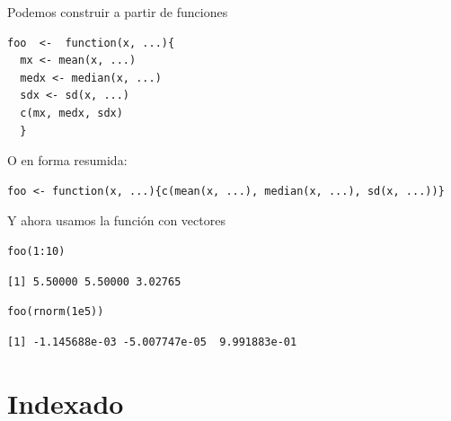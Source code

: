 \documentclass[xcolor={usenames,svgnames,dvipsnames}]{beamer}
\begin{document}
\begin{frame}[fragile,label={sec:orgheadline35}]{Podemos construir a partir de funciones}
 \lstset{language=R,label= ,caption= ,captionpos=b,numbers=none}
\begin{lstlisting}
foo  <-  function(x, ...){
  mx <- mean(x, ...)
  medx <- median(x, ...)
  sdx <- sd(x, ...)
  c(mx, medx, sdx)
  }
\end{lstlisting}

O en forma resumida:
\lstset{language=R,label= ,caption= ,captionpos=b,numbers=none}
\begin{lstlisting}
foo <- function(x, ...){c(mean(x, ...), median(x, ...), sd(x, ...))}
\end{lstlisting}
\end{frame}


\begin{frame}[fragile,label={sec:orgheadline36}]{Y ahora usamos la función con vectores}
 \lstset{language=R,label= ,caption= ,captionpos=b,numbers=none}
\begin{lstlisting}
foo(1:10)
\end{lstlisting}

\begin{verbatim}
[1] 5.50000 5.50000 3.02765
\end{verbatim}

\lstset{language=R,label= ,caption= ,captionpos=b,numbers=none}
\begin{lstlisting}
foo(rnorm(1e5))
\end{lstlisting}

\begin{verbatim}
[1] -1.145688e-03 -5.007747e-05  9.991883e-01
\end{verbatim}
\end{frame}

\section{Indexado}
\label{sec:orgheadline54}
\end{document}
